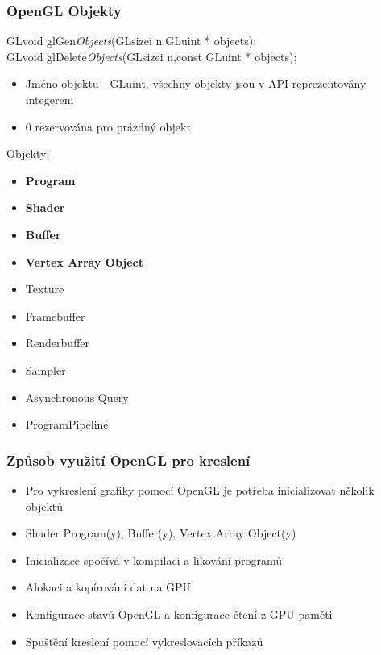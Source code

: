 \begin{frame}
\frametitle{OpenGL Objekty}
  GLvoid glGen{\it Objects}(GLsizei n,GLuint * objects);\\
  GLvoid glDelete{\it Objects}(GLsizei n,const GLuint * objects);
  \begin{itemize}
    \item Jméno objektu - GLuint, všechny objekty jsou v API reprezentovány integerem
    \item 0 rezervována pro prázdný objekt
  \end{itemize}
  Objekty:
  \begin{itemize}
    \item \textbf{Program}
    \item \textbf{Shader}
    \item \textbf{Buffer}
    \item \textbf{Vertex Array Object}
    \item Texture
    \item Framebuffer
    \item Renderbuffer
    \item Sampler
    \item Asynchronous Query
    \item ProgramPipeline
  \end{itemize}
\end{frame}

\begin{frame}
\frametitle{Způsob využití OpenGL pro kreslení}
  \begin{itemize}
    \item Pro vykreslení grafiky pomocí OpenGL je potřeba inicializovat několik objektů
    \item Shader Program(y), Buffer(y), Vertex Array Object(y)
    \item Inicializace spočívá v kompilaci a likování programů
    \item Alokaci a kopírování dat na GPU
    \item Konfigurace stavů OpenGL a konfigurace čtení z GPU paměti
    \item Spuštění kreslení pomocí vykreslovacích příkazů
  \end{itemize}
\end{frame}



